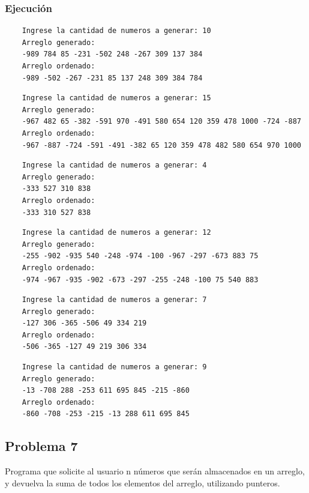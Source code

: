 \documentclass{article}
\begin{document}
	\subsubsection{Ejecución}
	
	\begin{lstlisting}
	Ingrese la cantidad de numeros a generar: 10
	Arreglo generado:
	-989 784 85 -231 -502 248 -267 309 137 384 
	Arreglo ordenado:
	-989 -502 -267 -231 85 137 248 309 384 784 
	\end{lstlisting}
	
	\begin{lstlisting}
	Ingrese la cantidad de numeros a generar: 15
	Arreglo generado:
	-967 482 65 -382 -591 970 -491 580 654 120 359 478 1000 -724 -887 
	Arreglo ordenado:
	-967 -887 -724 -591 -491 -382 65 120 359 478 482 580 654 970 1000 
	\end{lstlisting}
	
	\begin{lstlisting}
	Ingrese la cantidad de numeros a generar: 4
	Arreglo generado:
	-333 527 310 838
	Arreglo ordenado:
	-333 310 527 838
	\end{lstlisting}
	
	\begin{lstlisting}
	Ingrese la cantidad de numeros a generar: 12
	Arreglo generado:
	-255 -902 -935 540 -248 -974 -100 -967 -297 -673 883 75
	Arreglo ordenado:
	-974 -967 -935 -902 -673 -297 -255 -248 -100 75 540 883
	\end{lstlisting}
	
	\begin{lstlisting}
	Ingrese la cantidad de numeros a generar: 7
	Arreglo generado:
	-127 306 -365 -506 49 334 219
	Arreglo ordenado:
	-506 -365 -127 49 219 306 334
	\end{lstlisting}
	
	\begin{lstlisting}
	Ingrese la cantidad de numeros a generar: 9
	Arreglo generado:
	-13 -708 288 -253 611 695 845 -215 -860
	Arreglo ordenado:
	-860 -708 -253 -215 -13 288 611 695 845
	\end{lstlisting}
	
	\newpage
	
	\subsection{Problema 7}
	
	Programa que solicite al usuario n números que serán almacenados en un arreglo, y devuelva la suma de todos los elementos del arreglo, utilizando punteros.
	
\end{document}
